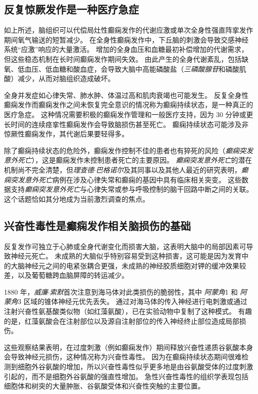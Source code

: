 \subsection{反复惊厥发作是一种医疗急症}

如上所述，脑组织可以代偿局灶性癫痫发作的代谢应激或单次全身性强直阵挛发作期间氧气输送的短暂减少。
在全身性癫痫发作中，下丘脑的刺激会导致交感神经系统“应激”响应的大量激活。
增加的全身血压和血糖最初补偿增加的代谢需求，但这些稳态机制在长时间癫痫发作期间失效。
由此产生的全身代谢紊乱，包括缺氧、低血压、低血糖和酸血症，会导致大脑中高能磷酸盐（\textit{三磷酸腺苷}和磷酸肌酸）减少，从而对脑组织造成破坏。


全身并发症如心律失常、肺水肿、体温过高和肌肉衰竭也可能发生。
反复全身性癫痫发作而癫痫发作之间未恢复完全意识的情况称为癫痫持续状态，是一种真正的医疗急症。
这种情况需要积极的癫痫发作管理和一般医疗支持，因为 30 分钟或更长时间的连续痉挛性癫痫发作会导致脑损伤甚至死亡。
癫痫持续状态可能涉及非惊厥性癫痫发作，其代谢后果要轻得多。


除了癫痫持续状态的危险外，癫痫发作控制不佳的患者也有猝死的风险（\textit{癫痫突发意外死亡}），这是癫痫发作未控制患者死亡的主要原因。
\textit{癫痫突发意外死亡}的潜在机制尚不完全清楚，但\textit{理查德$\cdot$巴格诺尔}及其同事以及其他人最近的研究表明，\textit{癫痫突发意外死亡}病例在涉及心律失常和癫痫的基因中具有临床相关突变。
这些数据支持\textit{癫痫突发意外死亡}与心律失常或参与呼吸控制的脑干回路中断之间的关联。
这个话题恰如其分地成为当前激烈调查的焦点。



\subsection{兴奋性毒性是癫痫发作相关脑损伤的基础}

反复发作可独立于心肺或全身代谢变化而损害大脑，这表明大脑中的局部因素可导致神经元死亡。
未成熟的大脑似乎特别容易受到这种损害，这可能是因为发育中的大脑神经元之间的电紧张耦合更强，未成熟的神经胶质细胞对钾的缓冲效果较差，以及葡萄糖跨血脑屏障的转运减少。


1880 年，\textit{威廉$\cdot$索默}首次注意到海马体对此类损伤的脆弱性，其中 \textit{阿蒙角}1 和 \textit{阿蒙角}3 区域的锥体神经元优先丢失。
通过对海马体的传入神经进行电刺激或通过注射兴奋性氨基酸类似物（如红藻氨酸），已在实验动物中复制了这种模式。
有趣的是，红藻氨酸会在注射部位以及源自注射部位的传入神经终止部位造成局部损伤。


这些观察结果表明，在过度刺激（例如癫痫发作）期间释放兴奋性递质谷氨酸本身会导致神经元损伤，这种情况称为兴奋性毒性。
因为在癫痫持续状态期间很难检测到细胞外谷氨酸的增加，所以兴奋性毒性似乎更多地是由谷氨酸受体的过度刺激引起的，而不是细胞外谷氨酸的强直性增加。
急性兴奋性毒性的组织学表现包括细胞体和树突的大量肿胀、谷氨酸受体和兴奋性突触的主要位置。


